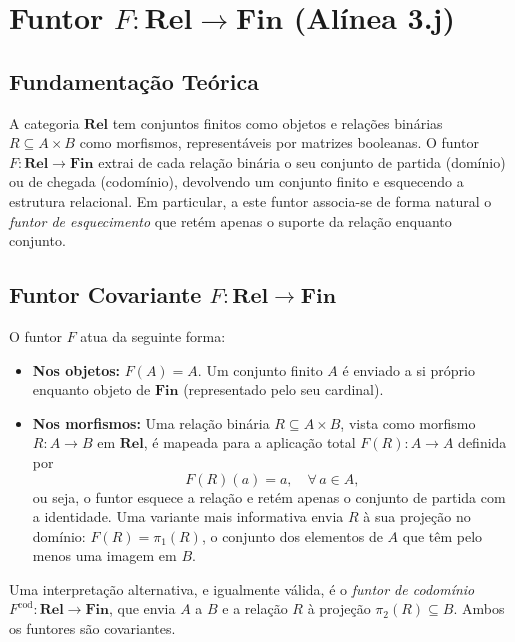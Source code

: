 \section{Funtor $F: \mathbf{Rel} \to \mathbf{Fin}$ (Alínea 3.j)}
\label{sec:functor-rel-fin}

\subsection{Fundamentação Teórica}

A categoria $\mathbf{Rel}$ tem conjuntos finitos como objetos e relações binárias $R \subseteq A \times B$ como morfismos, representáveis por matrizes booleanas. O funtor $F: \mathbf{Rel} \to \mathbf{Fin}$ extrai de cada relação binária o seu conjunto de partida (domínio) ou de chegada (codomínio), devolvendo um conjunto finito e esquecendo a estrutura relacional. Em particular, a este funtor associa-se de forma natural o \emph{funtor de esquecimento} que retém apenas o suporte da relação enquanto conjunto.

\subsection{Funtor Covariante $F: \mathbf{Rel} \to \mathbf{Fin}$}

\begin{definition}
O funtor $F$ atua da seguinte forma:
\begin{itemize}
    \item \textbf{Nos objetos:} $F(A) = A$. Um conjunto finito $A$ é enviado a si próprio enquanto objeto de $\mathbf{Fin}$ (representado pelo seu cardinal).
    \item \textbf{Nos morfismos:} Uma relação binária $R \subseteq A \times B$, vista como morfismo $R: A \to B$ em $\mathbf{Rel}$, é mapeada para a aplicação total $F(R): A \to A$ definida por
    \[
        F(R)(a) = a, \quad \forall\, a \in A,
    \]
    ou seja, o funtor esquece a relação e retém apenas o conjunto de partida com a identidade. Uma variante mais informativa envia $R$ à sua projeção no domínio: $F(R) = \pi_1(R)$, o conjunto dos elementos de $A$ que têm pelo menos uma imagem em $B$.
\end{itemize}
\end{definition}

\begin{remark}
Uma interpretação alternativa, e igualmente válida, é o \emph{funtor de codomínio} $F^{\mathrm{cod}}: \mathbf{Rel} \to \mathbf{Fin}$, que envia $A$ a $B$ e a relação $R$ à projeção $\pi_2(R) \subseteq B$. Ambos os funtores são covariantes.
\end{remark}

